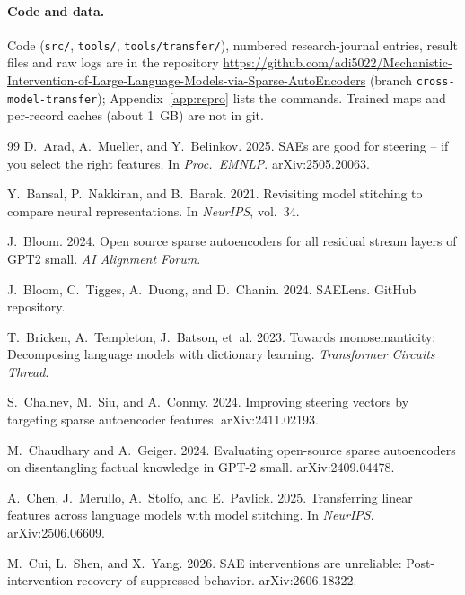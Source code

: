 \documentclass[11pt,twocolumn]{article}
\begin{document}
\paragraph{Code and data.} Code (\texttt{src/}, \texttt{tools/}, \texttt{tools/transfer/}), numbered research-journal entries, result files and raw logs are in the repository \url{https://github.com/adi5022/Mechanistic-Intervention-of-Large-Language-Models-via-Sparse-AutoEncoders} (branch \texttt{cross-model-transfer}); Appendix~\ref{app:repro} lists the commands. Trained maps and per-record caches (about 1~GB) are not in git.

\begingroup\small
\setlength{\bibsep}{2pt}
\begin{thebibliography}{99}
 D.~Arad, A.~Mueller, and Y.~Belinkov. 2025. SAEs are good for steering -- if you select the right features. In \textit{Proc.\ EMNLP}. arXiv:2505.20063.

 Y.~Bansal, P.~Nakkiran, and B.~Barak. 2021. Revisiting model stitching to compare neural representations. In \textit{NeurIPS}, vol.~34.

 J.~Bloom. 2024. Open source sparse autoencoders for all residual stream layers of GPT2 small. \textit{AI Alignment Forum}.

 J.~Bloom, C.~Tigges, A.~Duong, and D.~Chanin. 2024. SAELens. GitHub repository.

 T.~Bricken, A.~Templeton, J.~Batson, et~al. 2023. Towards monosemanticity: Decomposing language models with dictionary learning. \textit{Transformer Circuits Thread}.

 S.~Chalnev, M.~Siu, and A.~Conmy. 2024. Improving steering vectors by targeting sparse autoencoder features. arXiv:2411.02193.

 M.~Chaudhary and A.~Geiger. 2024. Evaluating open-source sparse autoencoders on disentangling factual knowledge in GPT-2 small. arXiv:2409.04478.

 A.~Chen, J.~Merullo, A.~Stolfo, and E.~Pavlick. 2025. Transferring linear features across language models with model stitching. In \textit{NeurIPS}. arXiv:2506.06609.

 M.~Cui, L.~Shen, and X.~Yang. 2026. SAE interventions are unreliable: Post-intervention recovery of suppressed behavior. arXiv:2606.18322.


\end{thebibliography}
\end{document}
